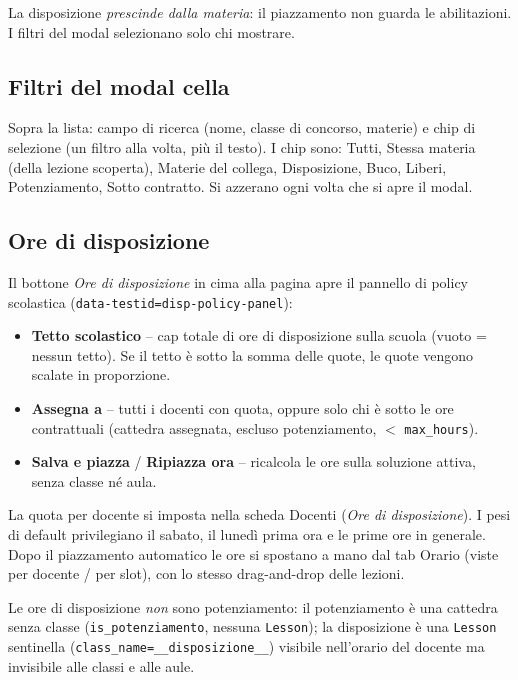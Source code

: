 La disposizione \emph{prescinde dalla materia}: il
piazzamento non guarda le abilitazioni. I filtri del modal
selezionano solo chi mostrare.

\subsection{Filtri del modal cella}

Sopra la lista: campo di ricerca (nome, classe di concorso,
materie) e chip di selezione (un filtro alla volta, pi\`u il
testo). I chip sono: Tutti, Stessa materia (della lezione
scoperta), Materie del collega, Disposizione, Buco, Liberi,
Potenziamento, Sotto contratto. Si azzerano ogni volta che
si apre il modal.

\subsection{Ore di disposizione}

Il bottone \emph{Ore di disposizione} in cima alla pagina
apre il pannello di policy scolastica
(\texttt{data-testid=disp-policy-panel}):

\begin{itemize}
\item \textbf{Tetto scolastico} -- cap totale di ore di
  disposizione sulla scuola (vuoto = nessun tetto). Se il
  tetto \`e sotto la somma delle quote, le quote vengono
  scalate in proporzione.
\item \textbf{Assegna a} -- tutti i docenti con quota,
  oppure solo chi \`e sotto le ore contrattuali (cattedra
  assegnata, escluso potenziamento, $<$ \texttt{max\_hours}).
\item \textbf{Salva e piazza} / \textbf{Ripiazza ora} --
  ricalcola le ore sulla soluzione attiva, senza classe
  n\'e aula.
\end{itemize}

La quota per docente si imposta nella scheda Docenti
(\emph{Ore di disposizione}). I pesi di default privilegiano
il sabato, il luned\`i prima ora e le prime ore in generale.
Dopo il piazzamento automatico le ore si spostano a mano dal
tab Orario (viste per docente / per slot), con lo stesso
drag-and-drop delle lezioni.

Le ore di disposizione \emph{non} sono potenziamento: il
potenziamento \`e una cattedra senza classe
(\texttt{is\_potenziamento}, nessuna \texttt{Lesson}); la
disposizione \`e una \texttt{Lesson} sentinella
(\texttt{class\_name=\_\_disposizione\_\_}) visibile
nell'orario del docente ma invisibile alle classi e alle
aule.

